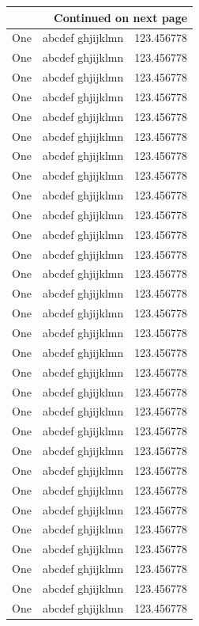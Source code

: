 {\begin{center}
\begin{longtable}{|l|l|l|}
		\hline \multicolumn{3}{|r|}{{Continued on next page}} \\ \hline
		\endfoot
		
		\hline \hline
		\endlastfoot
		
		One & abcdef ghjijklmn & 123.456778 \\
		One & abcdef ghjijklmn & 123.456778 \\
		One & abcdef ghjijklmn & 123.456778 \\
		One & abcdef ghjijklmn & 123.456778 \\
		One & abcdef ghjijklmn & 123.456778 \\
		One & abcdef ghjijklmn & 123.456778 \\
		One & abcdef ghjijklmn & 123.456778 \\
		One & abcdef ghjijklmn & 123.456778 \\
		One & abcdef ghjijklmn & 123.456778 \\
		One & abcdef ghjijklmn & 123.456778 \\
		One & abcdef ghjijklmn & 123.456778 \\
		One & abcdef ghjijklmn & 123.456778 \\
		One & abcdef ghjijklmn & 123.456778 \\
		One & abcdef ghjijklmn & 123.456778 \\
		One & abcdef ghjijklmn & 123.456778 \\
		One & abcdef ghjijklmn & 123.456778 \\
		One & abcdef ghjijklmn & 123.456778 \\
		One & abcdef ghjijklmn & 123.456778 \\
		One & abcdef ghjijklmn & 123.456778 \\
		One & abcdef ghjijklmn & 123.456778 \\
		One & abcdef ghjijklmn & 123.456778 \\
		One & abcdef ghjijklmn & 123.456778 \\
		One & abcdef ghjijklmn & 123.456778 \\
		One & abcdef ghjijklmn & 123.456778 \\
		One & abcdef ghjijklmn & 123.456778 \\
		One & abcdef ghjijklmn & 123.456778 \\
		One & abcdef ghjijklmn & 123.456778 \\
		One & abcdef ghjijklmn & 123.456778 \\
		One & abcdef ghjijklmn & 123.456778 \\
		One & abcdef ghjijklmn & 123.456778 \\

\end{longtable}
\end{center}}
